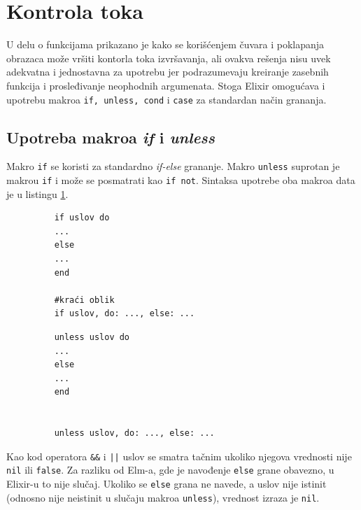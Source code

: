 \documentclass[12pt,oneside]{memoir}
\begin{document}
\section{Kontrola toka}
U delu o funkcijama prikazano je kako se korišćenjem čuvara i poklapanja obrazaca može
vršiti kontorla toka izvršavanja, ali ovakva rešenja nisu uvek adekvatna i jednostavna za
upotrebu jer podrazumevaju kreiranje zasebnih funkcija i prosleđivanje neophodnih
argumenata. Stoga Elixir omogućava i upotrebu makroa \texttt{if, unless, cond} i
\texttt{case} za standardan način grananja.

\subsection{Upotreba makroa \emph{if} i \emph{unless}}
Makro \texttt{if} se koristi za standardno \emph{if-else} grananje. Makro \texttt{unless} suprotan
je makrou \texttt{if} i može se posmatrati kao \texttt{if not}. Sintaksa upotrebe oba makroa data je u listingu
\ref{listing:elixirIf}. 
\begin{figure}[!h]
\begin{minipage}{0.5\textwidth} 
  \centering
  \begin{verbatim}
    if uslov do
    ...
    else
    ...
    end
    
    #kraći oblik
    if uslov, do: ..., else: ...
  \end{verbatim}
\end{minipage}
\begin{minipage}{0.5\textwidth}
  \centering
  \begin{verbatim}
    unless uslov do
    ...
    else
    ...
    end
    

    unless uslov, do: ..., else: ...
  \end{verbatim}
\end{minipage}
\label{listing:elixirIf}
\end{figure}
  
Kao kod operatora \texttt{\&\&} i \texttt{||} uslov se smatra tačnim ukoliko njegova vrednosti
nije \texttt{nil} ili \texttt{false}. Za razliku od Elm-a, gde je navođenje \texttt{else} grane
obavezno, u Elixir-u to nije slučaj. Ukoliko se \texttt{else} grana ne navede, a uslov nije istinit
(odnosno nije neistinit u slučaju makroa \texttt{unless}), vrednost izraza je \texttt{nil}.
\end{document}
